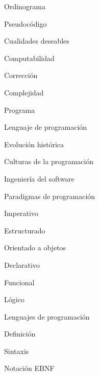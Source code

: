 \begin{longenum}
\begin{longenum}
\begin{longenum}
\begin{longenum}
\begin{longenum}
                    \item Ordinograma
                    \item Pseudocódigo
                \end{longenum}
                \item Cualidades deseables
                \item Computabilidad
                \item Corrección
                \item Complejidad
            \end{longenum}
            \item Programa
            \item Lenguaje de programación
        \end{longenum}
        \item Evolución histórica
        \begin{longenum}
            \item Culturas de la programación
            \item Ingeniería del software
        \end{longenum}
        \item Paradigmas de programación
        \begin{longenum}
            \item Imperativo
            \begin{longenum}
                \item Estructurado
                \item Orientado a objetos
            \end{longenum}
            \item Declarativo
            \begin{longenum}
                \item Funcional
                \item Lógico
            \end{longenum}
        \end{longenum}
        \item Lenguajes de programación
        \begin{longenum}
            \item Definición
            \begin{longenum}
                \item Sintaxis
                \begin{longenum}
                    \item Notación EBNF

\end{longenum}
\end{longenum}
\end{longenum}
\end{longenum}
\end{longenum}
